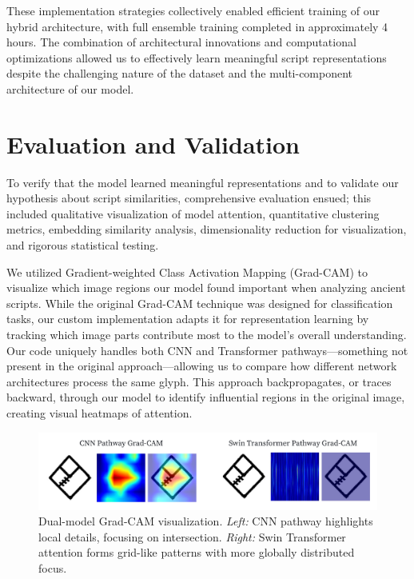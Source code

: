 \documentclass[11pt,a4paper,oneside]{report}
\begin{document}
These implementation strategies collectively enabled efficient training of our hybrid architecture, with full ensemble training completed in approximately 4 hours. The combination of architectural innovations and computational optimizations allowed us to effectively learn meaningful script representations despite the challenging nature of the dataset and the multi-component architecture of our model.

\section{Evaluation and Validation}
\noindent\hspace{1cm}
To verify that the model learned meaningful representations and to validate our hypothesis about script similarities, comprehensive evaluation ensued; this included qualitative visualization of model attention, quantitative clustering metrics, embedding similarity analysis, dimensionality reduction for visualization, and rigorous statistical testing.

We utilized Gradient-weighted Class Activation Mapping (Grad-CAM) to visualize which image regions our model found important when analyzing ancient scripts. While the original Grad-CAM technique \cite{selvaraju_grad-cam_2020} was designed for classification tasks, our custom implementation adapts it for representation learning by tracking which image parts contribute most to the model's overall understanding. Our code uniquely handles both CNN and Transformer pathways—something not present in the original approach—allowing us to compare how different network architectures process the same glyph. This approach backpropagates, or traces backward, through our model to identify influential regions in the original image, creating visual heatmaps of attention.

\begin{figure}[H]  
    \centering
    \includegraphics[width=1\linewidth]{Visualizations/Figures/Grad-CAM.pdf}
    \caption[Grad-CAM Visualizations for CNN and Swin Transformer Pathways]{Dual-model Grad-CAM visualization. \textit{Left:} CNN pathway highlights local details, focusing on intersection. 
    \textit{Right:} Swin Transformer attention forms grid-like patterns with more globally distributed focus.}
    \label{fig:gradcam}
\end{figure}
\end{document}
